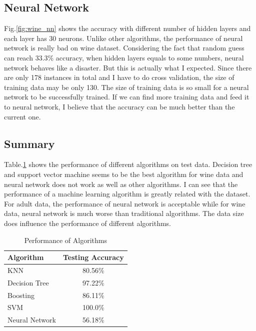 \documentclass[11pt]{article}
\begin{document}
\subsection{Neural Network}
Fig.\ref{fig:wine_nn} shows the accuracy with different number of hidden layers and each layer has 30 neurons. Unlike other algorithms, the performance of neural network is really bad on wine dataset. Considering the fact that random guess can reach 33.3\% accuracy, when hidden layers equals to some numbers, neural network behaves like a disaster. But this is actually what I expected. Since there are only 178 instances in total and I have to do cross validation, the size of training data may be only 130. The size of training data is so small for a neural network to be successfully trained. If we can find more training data and feed it to neural network, I believe that the accuracy can be much better than the current one. 
\subsection{Summary}
Table.\ref{tab:wine} shows the performance of different algorithms on test data. Decision tree and support vector machine seems to be the best algorithm for wine data and neural network does not work as well as other algorithms. I can see that the performance of a machine learning algorithm is greatly related with the dataset. For adult data, the performance of neural network is acceptable while for wine data, neural network is much worse than traditional algorithms. The data size does influence the performance of different algorithms.
\begin{table}[h!]
  \begin{center}
    \caption{Performance of Algorithms}
    \label{tab:wine}
    \begin{tabular}{l|c}
      \textbf{Algorithm} & \textbf{Testing Accuracy}\\
      \hline
      KNN & 80.56\%\\
      Decision Tree & 97.22\%\\
      Boosting & 86.11\%\\
      SVM & 100.0\% \\
      Neural Network & 56.18\%\\
    \end{tabular}
  \end{center}
\end{table}
\end{document}
